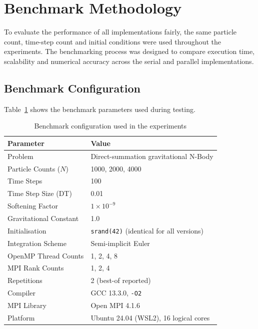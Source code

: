 \documentclass[11pt,a4paper]{article}
\begin{document}
\section{Benchmark Methodology}

To evaluate the performance of all implementations fairly, the same particle
count, time-step count and initial conditions were used throughout the
experiments. The benchmarking process was designed to compare execution time,
scalability and numerical accuracy across the serial and parallel
implementations.

\subsection{Benchmark Configuration}

Table~\ref{tab:config} shows the benchmark parameters used during testing.

\begin{table}[h]
\centering
\caption{Benchmark configuration used in the experiments}
\label{tab:config}
\begin{tabular}{ll}
\toprule
\textbf{Parameter} & \textbf{Value} \\
\midrule
Problem                  & Direct-summation gravitational N-Body \\
Particle Counts ($N$)    & 1000, 2000, 4000 \\
Time Steps               & 100 \\
Time Step Size (DT)      & 0.01 \\
Softening Factor         & $1 \times 10^{-9}$ \\
Gravitational Constant   & 1.0 \\
Initialisation           & \texttt{srand(42)} (identical for all versions) \\
Integration Scheme       & Semi-implicit Euler \\
OpenMP Thread Counts     & 1, 2, 4, 8 \\
MPI Rank Counts          & 1, 2, 4 \\
Repetitions              & 2 (best-of reported) \\
Compiler                 & GCC 13.3.0, \texttt{-O2} \\
MPI Library              & Open MPI 4.1.6 \\
Platform                 & Ubuntu 24.04 (WSL2), 16 logical cores \\
\bottomrule
\end{tabular}
\end{table}
\end{document}
